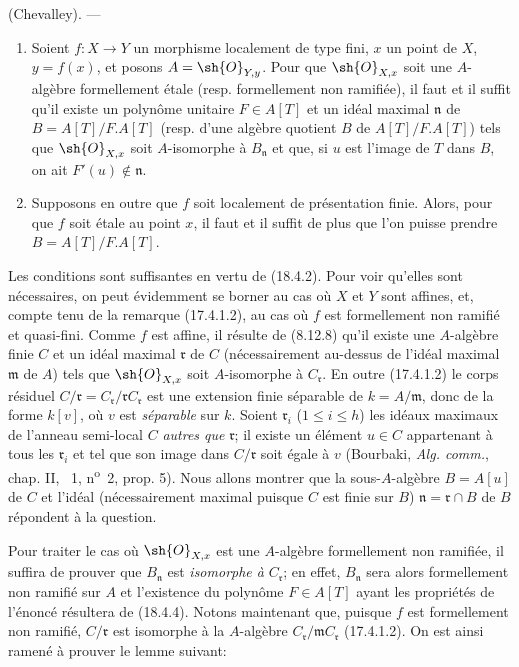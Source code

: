 \begin{theorem}[18.4.6]
\label{IV.18.4.6}
(Chevalley). ---
\begin{enumerate}
  \item[\textup{(i)}] Soient $f:X\to Y$ un morphisme localement de type fini, $x$ un point de $X$, $y=f(x)$, et posons $A=\sh{O}_{Y,y}$. Pour que $\sh{O}_{X,x}$ soit une $A$-algèbre formellement étale \textup{(resp.} formellement non ramifiée\textup{)}, il faut et il suffit qu'il existe un polynôme unitaire $F\in A[T]$ et un idéal maximal $\mathfrak n$ de $B=A[T]/F.A[T]$ \textup{(resp.} d'une algèbre quotient $B$ de $A[T]/F.A[T]$\textup{)} tels que $\sh{O}_{X,x}$ soit $A$-isomorphe à $B_{\mathfrak n}$ et que, si $u$ est l'image de $T$ dans $B$, on ait $F'(u)\notin\mathfrak n$.
  \item[\textup{(ii)}] Supposons en outre que $f$ soit localement de présentation finie. Alors, pour que $f$ soit étale au point $x$, il faut et il suffit de plus que l'on puisse prendre $B=A[T]/F.A[T]$.
\end{enumerate}
\end{theorem}

Les conditions sont suffisantes en vertu de (18.4.2). Pour voir qu'elles sont nécessaires, on peut évidemment se borner au cas où $X$ et $Y$ sont affines, et, compte tenu de la remarque (17.4.1.2), au cas où $f$ est formellement non ramifié et quasi-fini. Comme $f$ est affine, il résulte de (8.12.8) qu'il existe une $A$-algèbre finie $C$ et un idéal maximal $\mathfrak r$ de $C$ (nécessairement au-dessus de l'idéal maximal $\mathfrak m$ de $A$) tels que $\sh{O}_{X,x}$ soit $A$-isomorphe à $C_{\mathfrak r}$. En outre (17.4.1.2) le corps résiduel $C/\mathfrak r=C_{\mathfrak r}/\mathfrak rC_{\mathfrak r}$ est une extension finie séparable de $k=A/\mathfrak m$, donc de la forme $k[v]$, où $v$ est \emph{séparable} sur $k$. Soient $\mathfrak r_i$ ($1\leq i\leq h$) les idéaux maximaux de l'anneau semi-local $C$ \emph{autres que} $\mathfrak r$; il existe un élément $u\in C$ appartenant à tous les $\mathfrak r_i$ et tel que son image dans $C/\mathfrak r$ soit égale à $v$ (Bourbaki, \emph{Alg. comm.}, chap. II, \textsection~1, n\textsuperscript{o}~2, prop. 5). Nous allons montrer que la sous-$A$-algèbre $B=A[u]$ de $C$ et l'idéal (nécessairement maximal puisque $C$ est finie sur $B$) $\mathfrak n=\mathfrak r\cap B$ de $B$ répondent à la question.

Pour traiter le cas où $\sh{O}_{X,x}$ est une $A$-algèbre formellement non ramifiée, il suffira de prouver que $B_{\mathfrak n}$ est \emph{isomorphe à} $C_{\mathfrak r}$; en effet, $B_{\mathfrak n}$ sera alors formellement non ramifié sur $A$ et l'existence du polynôme $F\in A[T]$ ayant les propriétés de l'énoncé résultera de (18.4.4). Notons maintenant que, puisque $f$ est formellement non ramifié, $C/\mathfrak r$ est isomorphe à la $A$-algèbre $C_{\mathfrak r}/\mathfrak mC_{\mathfrak r}$ (17.4.1.2). On est ainsi ramené à prouver le lemme suivant:

